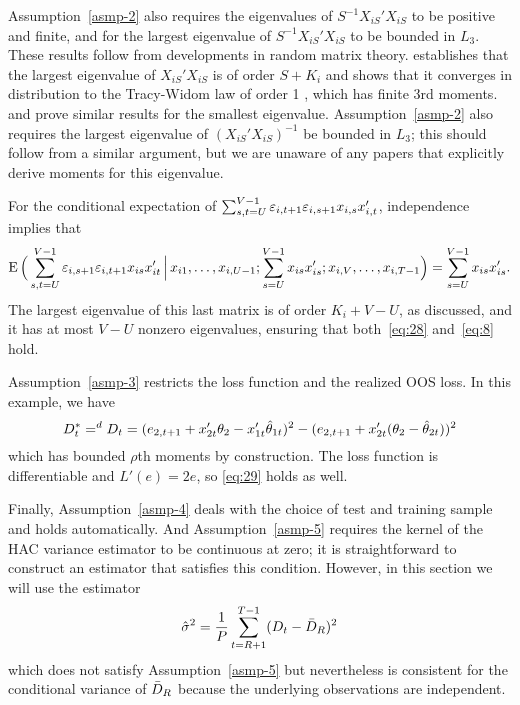 Assumption~\ref{asmp-2} also requires the eigenvalues of $S^{-1}
X_{iS}'X_{iS}$ to be positive and finite, and for the largest
eigenvalue of $S^{-1} X_{iS}'X_{iS}$ to be bounded in $L_3$.  These
results follow from developments in random matrix theory.
\citet{Gem:80} establishes that the largest eigenvalue of
$X_{iS}'X_{iS}$ is of order $S + K_i$ and \citet{Joh:01} shows that it
converges in distribution to the Tracy-Widom law of order 1
\citep{TrW:96}, which has finite 3rd moments. \citet{Sil:85} and
\citet{BFP:98} prove similar results for the smallest eigenvalue.
Assumption~\ref{asmp-2} also requires the largest eigenvalue of
$(X_{iS}'X_{iS})^{-1}$ be bounded in $L_3$; this should follow from a
similar argument, but we are unaware of any papers that explicitly
derive moments for this eigenvalue.

For the conditional expectation of %
$\sum_{s,t=U}^{V-1} \varepsilon_{i,t+1} \varepsilon_{i,s+1} x_{i,s} x_{i,t}'$,
independence implies that
\begin{equation*}
  \operatorname{E}\Big(
  \sum_{s,t=U}^{V-1} \varepsilon_{i,s+1} \varepsilon_{i,t+1} x_{is}x_{it}'
  \,\Big|\,
  x_{i1},\dots,x_{i,U-1};
  \sum_{s=U}^{V-1} x_{is} x_{is}';
  x_{i,V},\dots,x_{i,T-1}
  \Big)
  = \sum_{s=U}^{V-1} x_{is} x_{is}'.
\end{equation*}
The largest eigenvalue of this last matrix is of order $K_i + V - U$,
as discussed, and it has at most $V - U$ nonzero eigenvalues,
ensuring that both~\eqref{eq:28} and~\eqref{eq:8} hold.

Assumption~\ref{asmp-3} restricts the loss function and the realized
OOS loss. In this example, we have
\begin{equation*}
  D_t^* =^d D_t = (e_{2,t+1} + x_{2t}'\theta_2 - x_{1t}'\hat\theta_{1t})^2
  - (e_{2,t+1} + x_{2t}'(\theta_2 - \hat\theta_{2t}))^2
\end{equation*}
which has bounded $\rho$th moments by construction. The loss function
is differentiable and $L'(e) = 2 e$, so \eqref{eq:29} holds as well.

Finally, Assumption~\ref{asmp-4} deals with the choice of test and
training sample and holds automatically. And Assumption~\ref{asmp-5}
requires the kernel of the HAC variance estimator to be continuous at
zero; it is straightforward to construct an estimator that satisfies
this condition. However, in this section we will use the estimator
\begin{equation*}
  \hat{\sigma}^2 = \frac{1}{P} \sum_{t=R+1}^{T-1} (D_t - \bar{D}_{R})^2
\end{equation*}
which does not satisfy Assumption~\ref{asmp-5} but nevertheless is
consistent for the conditional variance of $\bar{D}_{R}$ because the
underlying observations are independent.

